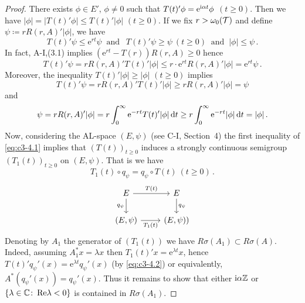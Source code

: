 \begin{proof}
	There exists $\phi \in E'$, $\phi \neq 0$ such that $T(t)'\phi = \mathrm{e}^{\mathrm{i}\alpha t}\phi$ $(t \geq 0)$. 
	Then we have $|\phi| = |T(t)'\phi| \leq T(t)'|\phi|$ $(t \geq 0)$.
	If we fix $r > \omega_0(\mathcal{T})$ and define $\psi \coloneqq  rR(r,A)'|\phi|$, we have
	\begin{equation}\label{eq:c3-4.1}
		T(t)'\psi \leq \mathrm{e}^{rt}\psi \ \text{ and } \ \ T(t)'\psi \geq \psi \ (t \geq 0) \ \text{ and } \ |\phi| \leq \psi\,.
	\end{equation}
	In fact, A-I,(3.1) implies $(\mathrm{e}^{rt} - T(r))R(r,A) \geq 0$ hence 
    \[
    T(t)'\psi = rR(r,A)'T(t)'|\phi| \leq r\cdot \mathrm{e}^{rt}R(r,A)'|\phi| = \mathrm{e}^{rt}\psi\,.
    \]
	Moreover, the inequality $T(t)'|\phi| \geq |\phi|$ $(t \geq 0)$ implies 
    \[
    T(t)'\psi = rR(r,A)'T(t)'|\phi| \geq rR(r,A)'|\phi| = \psi
    \]
    and 
    \[
    \psi = rR(r,A)'|\phi| = r \int_{0}^{\infty} \mathrm{e}^{-rt}T(t)'|\phi|\mathop{}\!\mathrm{d}{t}  \geq r\int_{0}^{\infty} \mathrm{e}^{-rt}|\phi|\mathop{}\!\mathrm{d}{t}  = |\phi|\,.
    \]
	Now, considering the AL-space $(E,\psi)$ (see C-I, Section~4) the first inequality of \eqref{eq:c3-4.1} implies that $(T(t))_{t \geq 0}$ induces a strongly continuous semigroup $(T_{1}(t))_{t \geq 0}$ on $(E,\psi)$.
	That is we have
	\begin{equation}\label{eq:c3-4.2}
    \textstyle
		T_{1}(t)\circ q_{\psi} = q_{\psi}\circ T(t) \ (t \geq 0)\,.
	\end{equation}
	\[
	\begin{tikzcd}
		E \arrow[r, "T(t)"] \arrow[d, "q_\psi"'] & E \arrow[d, "q_\psi"] \\
		(E,\psi) \arrow[r, "T_1(t)"'] & (E,\psi))
	\end{tikzcd}
	\]
	Denoting by $A_{1}$ the generator of $(T_{1}(t))$ we have $R\sigma(A_{1}) \subset R\sigma(A)$.
	Indeed, assuming $A_{1}^*x = \lambda x$ then $T_{1}(t)'x = \mathrm{e}^{\lambda t}x$, hence  $T(t)'q_{\psi}'(x) = \mathrm{e}^{\lambda t}q_{\psi}'(x)$ (by \eqref{eq:c3-4.2}) or equivalently, $A^*(q_{\psi}'(x)) = q_{\psi}'(x)$. 
	Thus it remains to show that either $\mathrm{i}\alpha\mathbb{Z}$ or $\{\lambda \in \mathbb{C}  \colon \mathop{}\!\mathrm{Re} \lambda < 0 \}$ is contained in $R\sigma(A_{1})$. 
	

\end{proof}
